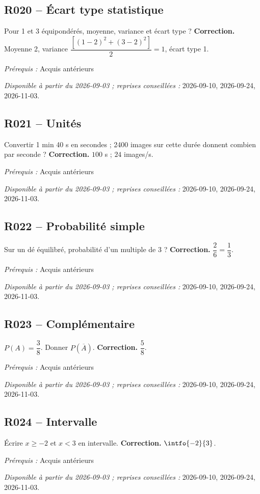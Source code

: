 \subsection*{R020 -- Écart type statistique}\label{R020}
Pour 1 et 3 équipondérés, moyenne, variance et écart type ?
\ifmxteacher\textbf{Correction.} Moyenne 2, variance $\dfrac{[(1-2)^2+(3-2)^2]}{2}=1$, écart type 1.\par\textit{Prérequis :} Acquis antérieurs\par\textit{Disponible à partir du 2026-09-03 ; reprises conseillées :} 2026-09-10, 2026-09-24, 2026-11-03.\fi
{}\subsection*{R021 -- Unités}\label{R021}
Convertir 1 min 40 s en secondes ; 2400 images sur cette durée donnent combien par seconde ?
\ifmxteacher\textbf{Correction.} $100$ s ; $24$ images/s.\par\textit{Prérequis :} Acquis antérieurs\par\textit{Disponible à partir du 2026-09-03 ; reprises conseillées :} 2026-09-10, 2026-09-24, 2026-11-03.\fi
{}\subsection*{R022 -- Probabilité simple}\label{R022}
Sur un dé équilibré, probabilité d’un multiple de 3 ?
\ifmxteacher\textbf{Correction.} $\dfrac{2}{6}=\dfrac{1}{3}$.\par\textit{Prérequis :} Acquis antérieurs\par\textit{Disponible à partir du 2026-09-03 ; reprises conseillées :} 2026-09-10, 2026-09-24, 2026-11-03.\fi
{}\subsection*{R023 -- Complémentaire}\label{R023}
$P(A)=\dfrac{3}{8}$. Donner $P(\overline A)$.
\ifmxteacher\textbf{Correction.} $\dfrac{5}{8}$.\par\textit{Prérequis :} Acquis antérieurs\par\textit{Disponible à partir du 2026-09-03 ; reprises conseillées :} 2026-09-10, 2026-09-24, 2026-11-03.\fi
{}\subsection*{R024 -- Intervalle}\label{R024}
Écrire $x\geq-2$ et $x<3$ en intervalle.
\ifmxteacher\textbf{Correction.} $\intfo{-2}{3}$.\par\textit{Prérequis :} Acquis antérieurs\par\textit{Disponible à partir du 2026-09-03 ; reprises conseillées :} 2026-09-10, 2026-09-24, 2026-11-03.\fi
